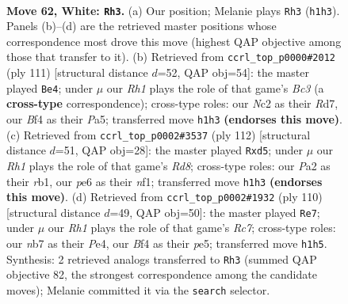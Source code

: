 \documentclass[11pt]{article}
\begin{document}
\clearpage

\begin{figure}[p]\centering
\begin{subfigure}{0.46\textwidth}\centering
\resizebox{\linewidth}{!}{%
\newchessgame
\chessboard[
  setfen={6kr/pn6/1pr1p3/7p/2PKPB2/6P1/P1N2R2/7R w - - 6 62},
  showmover=false,
  pgfstyle=straightmove, color=movearrow, markmove={h1-h3}
]}
\caption{}
\end{subfigure}\hfill
\begin{subfigure}{0.46\textwidth}\centering
\resizebox{\linewidth}{!}{%
\newchessgame
\chessboard[
  setfen={8/3r2k1/1pb2p2/p5pP/P5P1/3p3R/1P6/3R2K1 b - - 1 56},
  showmover=false,
  pgfstyle=straightmove, color=movearrow, markmove={c6-e4}
]}
\caption{}
\end{subfigure}
\\[4pt]
\begin{subfigure}{0.46\textwidth}\centering
\resizebox{\linewidth}{!}{%
\newchessgame
\chessboard[
  setfen={R2R4/5p2/6pk/3pP3/5r1p/5P1K/5NP1/1r3n2 w - - 0 57},
  showmover=false,
  pgfstyle=straightmove, color=movearrow, markmove={d8-d5}
]}
\caption{}
\end{subfigure}\hfill
\begin{subfigure}{0.46\textwidth}\centering
\resizebox{\linewidth}{!}{%
\newchessgame
\chessboard[
  setfen={3R4/2R3pk/p4r2/1p2p2p/4P2P/r2PK1P1/8/8 w - - 4 56},
  showmover=false,
  pgfstyle=straightmove, color=movearrow, markmove={c7-e7}
]}
\caption{}
\end{subfigure}
\caption{\textbf{Move 62, White: \texttt{Rh3}.} (a) Our position; Melanie plays \texttt{Rh3} (\texttt{h1h3}). Panels (b)--(d) are the retrieved master positions whose correspondence most drove this move (highest QAP objective among those that transfer to it). (b) Retrieved from \texttt{ccrl\_top\_p0000\#2012} (ply 111) [structural distance $d$=52, QAP obj=54]: the master played \texttt{Be4}; under $\mu$ our \emph{Rh1} plays the role of that game's \emph{Bc3} (a \textbf{cross-type} correspondence); cross-type roles: our \emph{N}c2 as their \emph{R}d7, our \emph{B}f4 as their \emph{P}a5; transferred move \texttt{h1h3} \textbf{(endorses this move)}. (c) Retrieved from \texttt{ccrl\_top\_p0002\#3537} (ply 112) [structural distance $d$=51, QAP obj=28]: the master played \texttt{Rxd5}; under $\mu$ our \emph{Rh1} plays the role of that game's \emph{Rd8}; cross-type roles: our \emph{P}a2 as their \emph{r}b1, our \emph{p}e6 as their \emph{n}f1; transferred move \texttt{h1h3} \textbf{(endorses this move)}. (d) Retrieved from \texttt{ccrl\_top\_p0002\#1932} (ply 110) [structural distance $d$=49, QAP obj=50]: the master played \texttt{Re7}; under $\mu$ our \emph{Rh1} plays the role of that game's \emph{Rc7}; cross-type roles: our \emph{n}b7 as their \emph{P}e4, our \emph{B}f4 as their \emph{p}e5; transferred move \texttt{h1h5}. Synthesis: 2 retrieved analogs transferred to \texttt{Rh3} (summed QAP objective 82, the strongest correspondence among the candidate moves); Melanie committed it via the \texttt{search} selector.}
\label{fig:thought-m122}
\end{figure}
\end{document}
